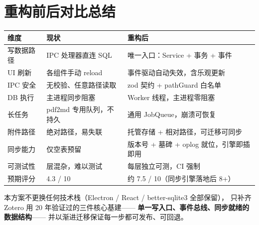 \documentclass[12pt, a4paper]{article}
\begin{document}
\section{重构前后对比总结}

\begin{center}
\begin{tabular}{p{3.4cm} p{4.6cm} p{4.6cm}}
  \toprule
  \textbf{维度} & \textbf{现状} & \textbf{重构后} \\
  \midrule
  写数据路径 & IPC 处理器直连 SQL & 唯一入口：Service + 事务 + 事件 \\
  UI 刷新 & 各组件手动 reload & 事件驱动自动失效，含乐观更新 \\
  IPC 安全 & 无校验、任意路径读取 & zod 契约 + pathGuard 白名单 \\
  DB 执行 & 主进程同步阻塞 & Worker 线程，主进程零阻塞 \\
  长任务 & pdf2md 专用队列，不持久 & 通用 JobQueue，崩溃可恢复 \\
  附件路径 & 绝对路径，易失联 & 托管存储 + 相对路径，可迁移可同步 \\
  同步能力 & 仅空表预留 & 版本号 + 墓碑 + oplog 就位，引擎即插即用 \\
  可测试性 & 层混杂，难以测试 & 每层独立可测，CI 强制 \\
  预期评分 & 4.3 / 10 & 约 7.5 / 10（同步引擎落地后 8+） \\
  \bottomrule
\end{tabular}
\end{center}

\begin{tcolorbox}[principlebox, title={一句话总结}]
  本方案不更换任何技术栈（Electron / React / better-sqlite3 全部保留），
  只补齐 Zotero 用 20 年验证过的三件核心基建——
  \textbf{单一写入口、事件总线、同步就绪的数据结构}——
  并以渐进迁移保证每一步都可发布、可回退。
\end{tcolorbox}

\end{document}
